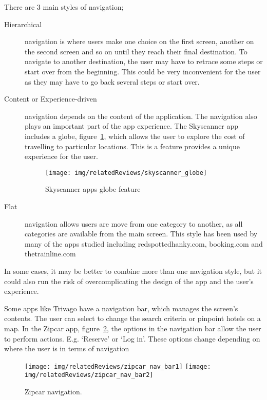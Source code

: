 There are 3 main styles of navigation;
\begin{description}
	\item[Hierarchical] navigation is where users make one choice on the first
		screen, another on the second screen and so on until they reach their
		final destination. To navigate to another destination, the user may
		have to retrace some steps or start over from the beginning. This could
		be very inconvenient for the user as they may have to go back several
		steps or start over.
	\item[Content or Experience-driven] navigation depends on the content of
		the application. The navigation also plays an important part of the app
		experience. The Skyscanner app includes a globe,
		figure~\ref{fig:skyscanner_globe}, which allows the user to explore the
		cost of travelling to particular locations. This is a feature provides
		a unique experience for the user.
		\begin{figure}[htbp]
			\begin{center}
				\texttt{[image: img/relatedReviews/skyscanner\_globe]}
			\end{center}
			\caption{Skyscanner apps globe feature}\label{fig:skyscanner_globe}
		\end{figure}

	\item[Flat] navigation allows users are move from one category to another,
		as all categories are available from the main screen. This style has
		been used by many of the apps studied including redspottedhanky.com,
		booking.com and thetrainline.com
\end{description}

In some cases, it may be better to combine more than one navigation style, but
it could also run the risk of overcomplicating the design of the app and the
user's experience.

Some apps like Trivago have a navigation bar, which manages the screen's
contents. The user can select to change the search criteria or pinpoint hotels
on a map. In the Zipcar app, figure~\ref{fig:zipcar_nav_bar}, the options in
the navigation bar allow the user to perform actions. E.g. `Reserve' or `Log
in'. These options change depending on where the user is in terms of navigation
\begin{figure}[htbp]
	\begin{center}
		\texttt{[image: img/relatedReviews/zipcar\_nav\_bar1]}
		\quad
		\texttt{[image: img/relatedReviews/zipcar\_nav\_bar2]}
	\end{center}
	\caption{Zipcar navigation\cite{ZipCarIOS}.}\label{fig:zipcar_nav_bar}
\end{figure}

